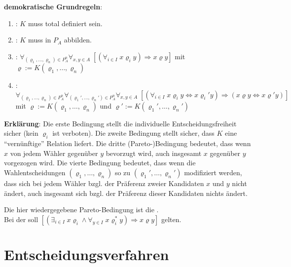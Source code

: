 \textbf{demokratische Grundregeln}:
\begin{enumerate}
    \item
    :
    $K$ muss total definiert sein.

    \item
    :
    $K$ muss in $P_A$ abbilden.

    \item
    :
    $\forall_{(\varrho_1, \dotsc, \varrho_n) \in P_A^n}
    \forall_{x, y \in A}\;
    [(\forall_{i \in I}\; x \varrho_i y) \Rightarrow x \varrho y]$
    mit $\varrho := K(\varrho_1, \dotsc, \varrho_n)$

    \item
    :\\
    $\forall_{(\varrho_1, \dotsc, \varrho_n) \in P_A^n}
    \forall_{(\varrho_1', \dotsc, \varrho_n') \in P_A^n}
    \forall_{x, y \in A}\;
    [(\forall_{i \in I}\; x \varrho_i y \Leftrightarrow x \varrho_i' y) \Rightarrow
    (x \varrho y \Leftrightarrow x \varrho' y)]$\\
    mit $\varrho := K(\varrho_1, \dotsc, \varrho_n)$
    und $\varrho' := K(\varrho_1', \dotsc, \varrho_n')$
\end{enumerate}

\textbf{Erklärung}:
Die erste Bedingung stellt die individuelle Entscheidungsfreiheit sicher
(kein $\varrho_i$ ist verboten).
Die zweite Bedingung stellt sicher, dass $K$ eine "`vernünftige"' Relation liefert.
Die dritte (Pareto-)Bedingung bedeutet, dass wenn $x$ von jedem Wähler gegenüber $y$
bevorzugt wird, auch insgesamt $x$ gegenüber $y$ vorgezogen wird.
Die vierte Bedingung bedeutet, dass wenn die Wahlentscheidungen $(\varrho_1, \dotsc, \varrho_n)$
so zu $(\varrho_1', \dotsc, \varrho_n')$ modifiziert werden, dass sich bei jedem Wähler
bzgl. der Präferenz zweier Kandidaten $x$ und $y$ nicht ändert, auch insgesamt sich bzgl. der
Präferenz dieser Kandidaten nichts ändert.

Die hier wiedergegebene Pareto-Bedingung ist die .\\
Bei der  soll
$[(\exists_{i \in I}\; x \varrho_i  \land \forall_{y \in I}\; x \varrho_i^\ast y)
\Rightarrow x \varrho y]$ gelten.

\pagebreak

\section{%
    Entscheidungsverfahren%
}

